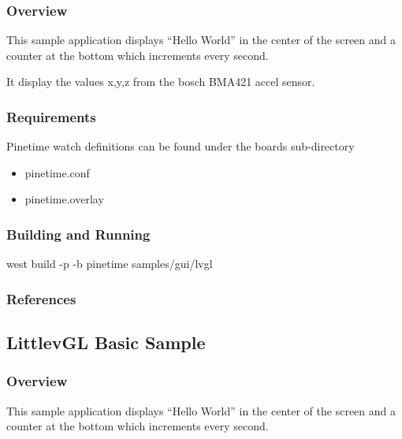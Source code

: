 \documentclass[letterpaper,10pt,english]{sphinxmanual}
\begin{document}
\subsubsection{Overview}
\label{\detokenize{samples/gui/lvaccel/README:overview}}
This sample application displays “Hello World” in the center of the screen
and a counter at the bottom which increments every second.

It display the values x,y,z from the bosch BMA421 accel sensor.


\subsubsection{Requirements}
\label{\detokenize{samples/gui/lvaccel/README:requirements}}
Pinetime watch
definitions can be found under the boards sub-directory
\begin{itemize}
\item {} 
pinetime.conf

\item {} 
pinetime.overlay

\end{itemize}


\subsubsection{Building and Running}
\label{\detokenize{samples/gui/lvaccel/README:building-and-running}}
west build -p -b pinetime samples/gui/lvgl


\subsubsection{References}
\label{\detokenize{samples/gui/lvaccel/README:references}}

\subsection{LittlevGL Basic Sample}
\label{\detokenize{samples/gui/lvgl/README:littlevgl-basic-sample}}\label{\detokenize{samples/gui/lvgl/README:lvgl-sample}}\label{\detokenize{samples/gui/lvgl/README::doc}}

\subsubsection{Overview}
\label{\detokenize{samples/gui/lvgl/README:overview}}
This sample application displays “Hello World” in the center of the screen
and a counter at the bottom which increments every second.
\end{document}
